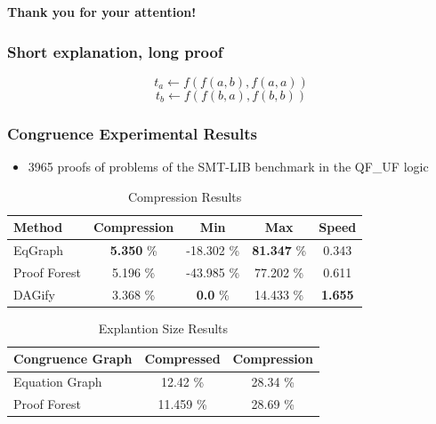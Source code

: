 \documentclass{beamer}
\begin{document}
\begin{frame}

\centering \textbf{\LARGE{Thank you for your attention!}}

\end{frame}

\begin{frame}

\frametitle{Short explanation, long proof}

$$t_a \leftarrow f(f(a,b),f(a,a))$$
$$t_b \leftarrow f(f(b,a),f(b,b))$$



\end{frame}

\begin{frame}

\frametitle{Congruence Experimental Results}

\begin{itemize}
		\item 3965 proofs of problems of the SMT-LIB benchmark in the QF\_UF logic
\end{itemize}

\begin{table}[h]
\centering
\begin{tabular}{l c c c c}
\toprule
\textbf{Method} & \textbf{Compression} & \textbf{Min} & \textbf{Max} & \textbf{Speed}\\ 
\midrule

EqGraph & \textbf{5.350} \% & -18.302 \% & \textbf{81.347} \% & 0.343 \\ 
Proof Forest &  5.196 \% & -43.985 \% & 77.202 \% & 0.611 \\ 
DAGify & 3.368 \% & \textbf{0.0} \% & 14.433 \% & \textbf{1.655} \\ 

\bottomrule
\end{tabular}
\caption{Compression Results}
\label{tab:congruence_results}
\end{table}

\begin{table}[h]
\centering
\begin{tabular}{l c c}
\toprule
\textbf{Congruence Graph} & \textbf{Compressed} & \textbf{Compression} \\ 
\midrule

Equation Graph & 12.42 \% & 28.34 \% \\ 
Proof Forest & 11.459 \% & 28.69 \% \\ 

\bottomrule
\end{tabular}
\caption{Explantion Size Results}
\label{tab:explanation_results}
\end{table}

\end{frame}
\end{document}
